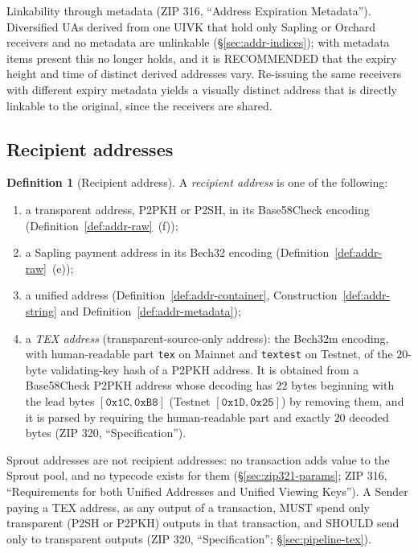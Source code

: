 \documentclass[11pt,a4paper]{article}
\theoremstyle{definition}
\newtheorem{definition}[theorem]{Definition}
\begin{document}
Linkability through metadata (ZIP 316, ``Address Expiration Metadata'').
Diversified UAs derived from one UIVK that hold only Sapling or Orchard
receivers and no metadata are unlinkable (\S\ref{sec:addr-indices}); with
metadata items present this no longer holds, and it is RECOMMENDED that the
expiry height and time of distinct derived addresses vary. Re-issuing the
same receivers with different expiry metadata yields a visually distinct
address that is directly linkable to the original, since the receivers are
shared.

\subsection{Recipient addresses}\label{sec:addr-recipients}

\begin{definition}[Recipient address]\label{def:addr-recipient}
A \emph{recipient address} is one of the following:
\begin{enumerate}
\item a transparent address, P2PKH or P2SH, in its Base58Check encoding
  (Definition~\ref{def:addr-raw}~(f));
\item a Sapling payment address in its Bech32 encoding
  (Definition~\ref{def:addr-raw}~(e));
\item a unified address (Definition~\ref{def:addr-container},
  Construction~\ref{def:addr-string} and
  Definition~\ref{def:addr-metadata});
\item a \emph{TEX address} (transparent-source-only address): the Bech32m
  encoding, with human-readable part \texttt{tex} on Mainnet and
  \texttt{textest} on Testnet, of the $20$-byte validating-key hash of a
  P2PKH address. It is obtained from a Base58Check P2PKH address whose
  decoding has $22$ bytes beginning with the lead bytes
  $[\mathtt{0x1C}, \mathtt{0xB8}]$ (Testnet $[\mathtt{0x1D},
  \mathtt{0x25}]$) by removing them, and it is parsed by requiring the
  human-readable part and exactly $20$ decoded bytes (ZIP 320,
  ``Specification'').
\end{enumerate}
Sprout addresses are not recipient addresses: no transaction adds value to
the Sprout pool, and no typecode exists for them (\S\ref{sec:zip321-params};
ZIP 316, ``Requirements for both Unified Addresses and Unified Viewing
Keys''). A Sender paying a TEX address, as any output of a transaction, MUST
spend only transparent (P2SH or P2PKH) outputs in that transaction, and
SHOULD send only to transparent outputs (ZIP 320, ``Specification'';
\S\ref{sec:pipeline-tex}).


\end{definition}
\end{document}
